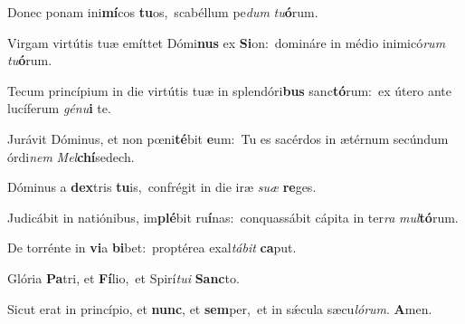 \setcounter{versecount}{2}

\vs Donec ponam ini\textbf{mí}cos \textbf{tu}os,~\redgreheightstar scabéllum pe\textit{dum} \textit{tu}\textbf{ó}rum.

\vs Virgam virtútis tuæ emíttet Dómi\textbf{nus} ex \textbf{Si}on:~\redgreheightstar domináre in médio inimicó\textit{rum} \textit{tu}\textbf{ó}rum.

\vs Tecum princípium in die virtútis tuæ in splendóri\textbf{bus} sanc\textbf{tó}rum:~\redgreheightstar ex útero ante lucíferum \textit{gé}\textit{nu}\textbf{i} te.

\vs Jurávit Dóminus, et non pœni\textbf{té}bit \textbf{e}um:~\redgreheightstar Tu es sacérdos in ætérnum secúndum órdi\textit{nem} \textit{Mel}\textbf{chí}sedech.

\vs Dóminus a \textbf{dex}tris \textbf{tu}is,~\redgreheightstar confrégit in die iræ \textit{su}\textit{æ} \textbf{re}ges.

\vs Judicábit in natiónibus, im\textbf{plé}bit ru\textbf{í}nas:~\redgreheightstar conquassábit cápita in ter\textit{ra} \textit{mul}\textbf{tó}rum.

\vs De torrénte in \textbf{vi}a \textbf{bi}bet:~\redgreheightstar proptérea exal\textit{tá}\textit{bit} \textbf{ca}put.

\vs Glória \textbf{Pa}tri, et \textbf{Fí}lio,~\redgreheightstar et Spirí\textit{tu}\textit{i} \textbf{Sanc}to.

\vs Sicut erat in princípio, et \textbf{nunc}, et \textbf{sem}per,~\redgreheightstar et in sǽcula sæcu\textit{ló}\textit{rum}. \textbf{A}men.

